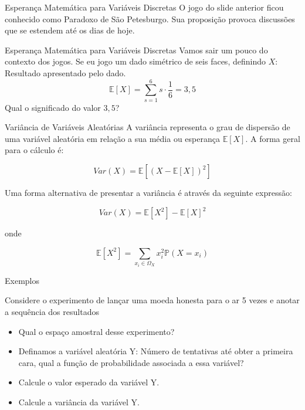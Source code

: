 \begin{frame}{Esperança Matemática para Variáveis Discretas }
    O jogo do slide anterior ficou conhecido como Paradoxo de São Petesburgo. Sua proposição provoca discussões que se estendem até os dias de hoje. 
\end{frame}

\begin{frame}{Esperança Matemática para Variáveis Discretas }
    Vamos sair um pouco do contexto dos jogos. Se eu jogo um dado simétrico de seis faces, 
    definindo $X:$ Resultado apresentado pelo dado. 
\pause
    $$\mathds{E}[X] = \sum_{s=1}^{6} s \cdot \frac{1}{6} = 3,5$$
\pause
Qual o significado do valor $3,5$?
\end{frame}

\begin{frame}{Variância de Variáveis Aleatórias}
    A variância representa o grau de dispersão de uma variável aleatória em relação a sua média ou esperança $\mathbb{E}[X]$. A forma geral para o cálculo é:

    $$Var(X) = \mathbb{E}[(X - \mathbb{E}[X])^2]$$

    Uma forma alternativa de presentar a variância é através da seguinte expressão:

    $$Var(X) = \mathbb{E}[X^2] - \mathbb{E}[X]^2$$

    onde

     $$\mathbb{E}[X^2] = \sum_{x_i \in \Omega_X} x_i^2 \mathds{P}(X=x_i)$$
\end{frame}

\begin{frame}{Exemplos}
\begin{exemplo}
     Considere o experimento de lançar uma moeda honesta para o ar 5 vezes e anotar a sequência dos resultados

    \begin{itemize}
        \item Qual o espaço amostral desse experimento?
        \item Definamos a variável aleatória Y: Número de tentativas até obter a primeira cara, qual a função de probabilidade associada a essa variável?
        \item Calcule o valor esperado da variável Y.
        \item Calcule a variância da variável Y.
    \end{itemize} 
\end{exemplo}
    
\end{frame}

